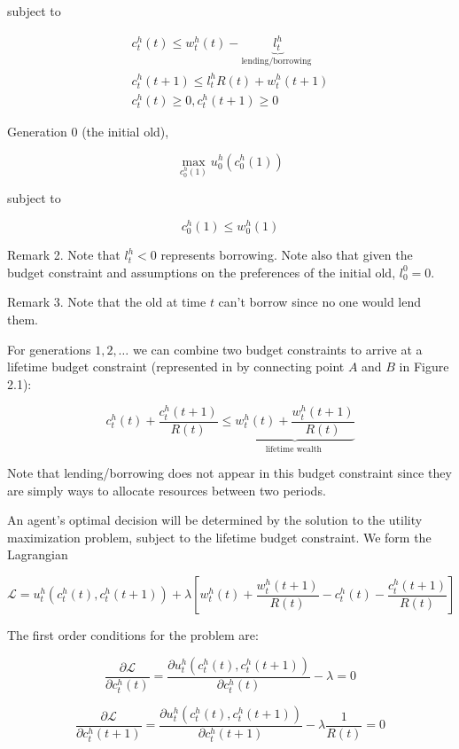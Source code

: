 \documentclass[10pt]{article}
\begin{document}
subject to

$$
\begin{gathered}
c_{t}^{h}(t) \leq w_{t}^{h}(t)-\underbrace{l_{t}^{h}}_{\text {lending/borrowing }} \\
c_{t}^{h}(t+1) \leq l_{t}^{h} R(t)+w_{t}^{h}(t+1) \\
c_{t}^{h}(t) \geq 0, c_{t}^{h}(t+1) \geq 0
\end{gathered}
$$

Generation 0 (the initial old),


\begin{equation*}
\max _{c_{0}^{h}(1)} u_{0}^{h}\left(c_{0}^{h}(1)\right) \tag{4}
\end{equation*}


subject to

$$
c_{0}^{h}(1) \leq w_{0}^{h}(1)
$$

Remark 2. Note that $l_{t}^{h}<0$ represents borrowing. Note also that given the budget constraint and assumptions on the preferences of the initial old, $l_{0}^{0}=0$.

Remark 3. Note that the old at time $t$ can't borrow since no one would lend them.

For generations $1,2, \ldots$ we can combine two budget constraints to arrive at a lifetime budget constraint (represented in by connecting point $A$ and $B$ in Figure 2.1):

$$
c_{t}^{h}(t)+\frac{c_{t}^{h}(t+1)}{R(t)} \leq \underbrace{w_{t}^{h}(t)+\frac{w_{t}^{h}(t+1)}{R(t)}}_{\text {lifetime wealth }}
$$

Note that lending/borrowing does not appear in this budget constraint since they are simply ways to allocate resources between two periods.

An agent's optimal decision will be determined by the solution to the utility maximization problem, subject to the lifetime budget constraint. We form the Lagrangian

$$
\mathcal{L}=u_{t}^{h}\left(c_{t}^{h}(t), c_{t}^{h}(t+1)\right)+\lambda\left[w_{t}^{h}(t)+\frac{w_{t}^{h}(t+1)}{R(t)}-c_{t}^{h}(t)-\frac{c_{t}^{h}(t+1)}{R(t)}\right]
$$

The first order conditions for the problem are:

$$
\frac{\partial \mathcal{L}}{\partial c_{t}^{h}(t)}=\frac{\partial u_{t}^{h}\left(c_{t}^{h}(t), c_{t}^{h}(t+1)\right)}{\partial c_{t}^{h}(t)}-\lambda=0
$$

$$
\frac{\partial \mathcal{L}}{\partial c_{t}^{h}(t+1)}=\frac{\partial u_{t}^{h}\left(c_{t}^{h}(t), c_{t}^{h}(t+1)\right)}{\partial c_{t}^{h}(t+1)}-\lambda \frac{1}{R(t)}=0
$$
\end{document}
